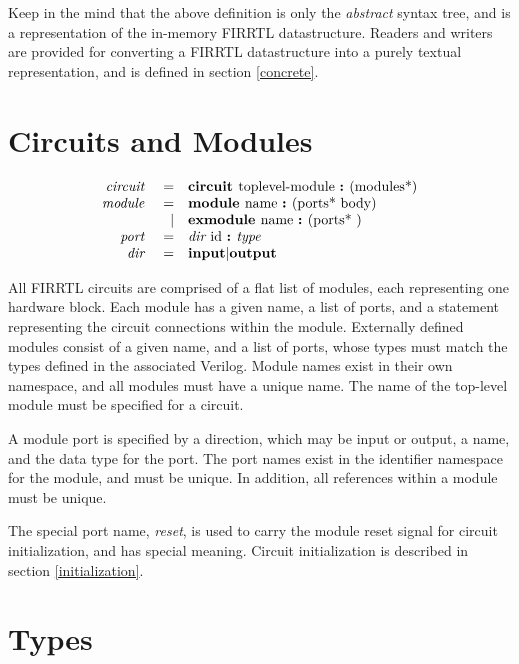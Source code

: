\documentclass[12pt]{article}
\begin{document}
Keep in the mind that the above definition is only the {\em abstract} syntax tree, and is a representation of the in-memory FIRRTL datastructure. Readers and writers are provided for converting a FIRRTL datastructure into a purely textual representation, and is defined in section \ref{concrete}.


\section{Circuits and Modules}
\[
\begin{array}{rrl}
\text{\em circuit\ }    &=     &\text{\bf circuit\ } \text{toplevel-module } \text{\bf :\ } (\text{modules*}) \\
\text{\em module\ }     &=     &\text{\bf module\ }  \text{name } \text{\bf :\ } (\text{ports* } \text{body}) \\
                &\vert &\text{\bf exmodule\ }  \text{name } \text{\bf :\ } (\text{ports* })           \\ 
\text{\em port\ }       &=     &\text{\em dir\ } \text{id } \text{\bf :\ } \text{\em type\ }                                 \\
\text{\em dir\ }        &=     &\text{\bf input} \vert \text{\bf output}                                \\
\end{array}
\]

All FIRRTL circuits are comprised of a flat list of modules, each representing one hardware block.
Each module has a given name, a list of ports, and a statement representing the circuit connections within the module.
Externally defined modules consist of a given name, and a list of ports, whose types must match the types defined in the associated Verilog.
Module names exist in their own namespace, and all modules must have a unique name. The name of the top-level module must be specified for a circuit.

A module port is specified by a direction, which may be input or output, a name, and the data type for the port.
The port names exist in the identifier namespace for the module, and must be unique.
In addition, all references within a module must be unique.

The special port name, {\em reset}, is used to carry the module reset signal for circuit initialization, and has special meaning.
Circuit initialization is described in section \ref{initialization}. 

\section{Types}
\end{document}
